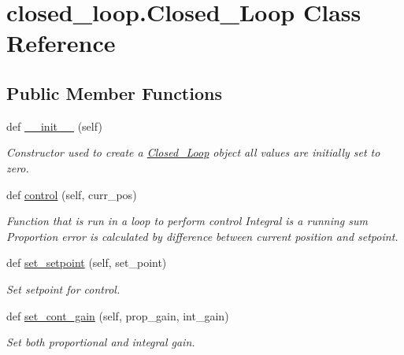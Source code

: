 \hypertarget{classclosed__loop_1_1_closed___loop}{}\section{closed\+\_\+loop.\+Closed\+\_\+\+Loop Class Reference}
\label{classclosed__loop_1_1_closed___loop}
\subsection*{Public Member Functions}
\begin{DoxyCompactItemize}
\item 
\mbox{\label{classclosed__loop_1_1_closed___loop_ae5236ac65bf24d2b7e7ddc3e5af2ac41}} 
def \mbox{\hyperlink{classclosed__loop_1_1_closed___loop_ae5236ac65bf24d2b7e7ddc3e5af2ac41}{\+\_\+\+\_\+init\+\_\+\+\_\+}} (self)
\begin{DoxyCompactList}\small\item\em Constructor used to create a \mbox{\hyperlink{classclosed__loop_1_1_closed___loop}{Closed\+\_\+\+Loop}} object all values are initially set to zero. \end{DoxyCompactList}\item 
def \mbox{\hyperlink{classclosed__loop_1_1_closed___loop_a3f3be180b49ecd228fc0a14bec29cb2a}{control}} (self, curr\+\_\+pos)
\begin{DoxyCompactList}\small\item\em Function that is run in a loop to perform control Integral is a running sum Proportion error is calculated by difference between current position and setpoint. \end{DoxyCompactList}\item 
def \mbox{\hyperlink{classclosed__loop_1_1_closed___loop_a06332805a3fba3aee9bacc2843840ae7}{set\+\_\+setpoint}} (self, set\+\_\+point)
\begin{DoxyCompactList}\small\item\em Set setpoint for control. \end{DoxyCompactList}\item 
def \mbox{\hyperlink{classclosed__loop_1_1_closed___loop_af47dbd741bdc69255ebc85bc2e425be1}{set\+\_\+cont\+\_\+gain}} (self, prop\+\_\+gain, int\+\_\+gain)
\begin{DoxyCompactList}\small\item\em Set both proportional and integral gain. \end{DoxyCompactList}\end{DoxyCompactItemize}
